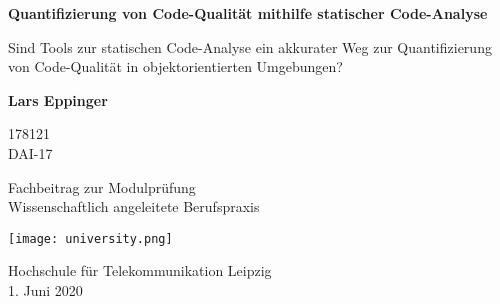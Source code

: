 \begin{titlepage}
    \begin{center}
        \vspace*{1cm}
        
        \Huge
        \textbf{Quantifizierung von Code-Qualität mithilfe statischer Code-Analyse}
        
        \vspace{0.5cm}
        \LARGE
        Sind Tools zur statischen Code-Analyse ein akkurater Weg zur Quantifizierung von Code-Qualität in objektorientierten Umgebungen?
        
        \vspace{1.5cm}
        
        \textbf{Lars Eppinger}

        \Large
        178121\\
        DAI-17
        
        \vfill
        
        Fachbeitrag zur Modulprüfung\\Wissenschaftlich angeleitete Berufspraxis
        
        \vspace{0.8cm}
        
        \texttt{[image: university.png]}
        
        \Large
        Hochschule für Telekommunikation Leipzig\\
        1. Juni 2020
        
    \end{center}
\end{titlepage}